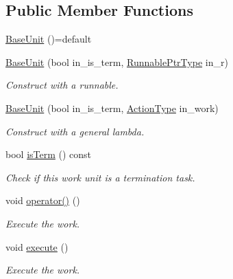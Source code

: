 \subsection*{Public Member Functions}
\begin{DoxyCompactItemize}
\item 
\hyperlink{structvt_1_1sched_1_1_base_unit_a32cf291cd87b43dffa1f086d0ddb6c30}{Base\+Unit} ()=default
\item 
\hyperlink{structvt_1_1sched_1_1_base_unit_a4223dce0bcccbb989eb49106d2e37abe}{Base\+Unit} (bool in\+\_\+is\+\_\+term, \hyperlink{structvt_1_1sched_1_1_base_unit_a9be5d5adaeb011c8ef82f751485ebf9a}{Runnable\+Ptr\+Type} in\+\_\+r)
\begin{DoxyCompactList}\small\item\em Construct with a runnable. \end{DoxyCompactList}\item 
\hyperlink{structvt_1_1sched_1_1_base_unit_a46072cff720f9dbcf7a1af4f9794ba90}{Base\+Unit} (bool in\+\_\+is\+\_\+term, \hyperlink{namespacevt_ae0a5a7b18cc99d7b732cb4d44f46b0f3}{Action\+Type} in\+\_\+work)
\begin{DoxyCompactList}\small\item\em Construct with a general lambda. \end{DoxyCompactList}\item 
bool \hyperlink{structvt_1_1sched_1_1_base_unit_a18e4bf669d499be8e9443011bf9c6b02}{is\+Term} () const
\begin{DoxyCompactList}\small\item\em Check if this work unit is a termination task. \end{DoxyCompactList}\item 
void \hyperlink{structvt_1_1sched_1_1_base_unit_accbb274436789b6b8ed99c3ee42a8114}{operator()} ()
\begin{DoxyCompactList}\small\item\em Execute the work. \end{DoxyCompactList}\item 
void \hyperlink{structvt_1_1sched_1_1_base_unit_aba3a1772f8a5efb922656dfba6434136}{execute} ()
\begin{DoxyCompactList}\small\item\em Execute the work. \end{DoxyCompactList}\end{DoxyCompactItemize}
